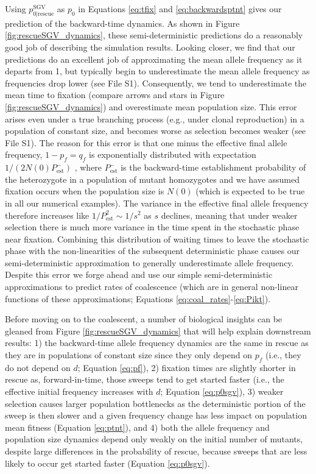 \documentclass[]{article}
\begin{document}
Using $p_{0|\mathrm{rescue}}^\mathrm{SGV}$ as $p_0$ in Equations \ref{eq:tfix} and \ref{eq:backwardsptnt} gives our prediction of the backward-time dynamics.
As shown in Figure \ref{fig:rescueSGV_dynamics}, these semi-deterministic predictions do a reasonably good job of describing the simulation results.
Looking closer, we find that our predictions do an excellent job of approximating the mean allele frequency as it departs from 1, but typically begin to underestimate the mean allele frequency as frequencies drop lower (see File S1).
Consequently, we tend to underestimate the mean time to fixation (compare arrows and stars in Figure \ref{fig:rescueSGV_dynamics}) and overestimate mean population size.
This error arises even under a true branching process (e.g., under clonal reproduction) in a population of constant size, and becomes worse as selection becomes weaker (see File S1).
The reason for this error is that one minus the effective final allele frequency, $1-p_f = q_f$ is exponentially distributed with expectation $1/(2N(0)P_\mathrm{est}^-)$ \citep{martin2015simple}, where $P_\mathrm{est}^-$ is the backward-time establishment probability of the heterozygote in a population of mutant homozygotes and we have assumed fixation occurs when the population size is $N(0)$ (which is expected to be true in all our numerical examples).  
The variance in the effective final allele frequency therefore increases like $1/P_\mathrm{est}^2 \sim 1/s^2$ as $s$ declines, meaning that under weaker selection there is much more variance in the time spent in the stochastic phase near fixation.
Combining this distribution of waiting times to leave the stochastic phase with the non-linearities of the subsequent deterministic phase causes our semi-deterministic approximation to generally underestimate allele frequency.
Despite this error we forge ahead and use our simple semi-deterministic approximations to predict rates of coalescence (which are in general non-linear functions of these approximations; Equations \ref{eq:coal_rates}-\ref{eq:Pikt}).

Before moving on to the coalescent, a number of biological insights can be gleaned from Figure \ref{fig:rescueSGV_dynamics} that will help explain downstream results:
1) the backward-time allele frequency dynamics are the same in rescue as they are in populations of constant size since they only depend on $p_f$ (i.e., they do not depend on $d$; Equation \ref{eq:pf}),
2) fixation times are slightly shorter in rescue as, forward-in-time, those sweeps tend to get started faster (i.e., the effective initial frequency increases with $d$; Equation \ref{eq:p0sgv}),
3) weaker selection causes larger population bottlenecks as the deterministic portion of the sweep is then slower and a given frequency change has less impact on population mean fitness (Equation \ref{eq:ptnt}), and
4) both the allele frequency and population size dynamics depend only weakly on the initial number of mutants, despite large differences in the probability of rescue, because sweeps that are less likely to occur get started faster (Equation \ref{eq:p0sgv}).
\end{document}
